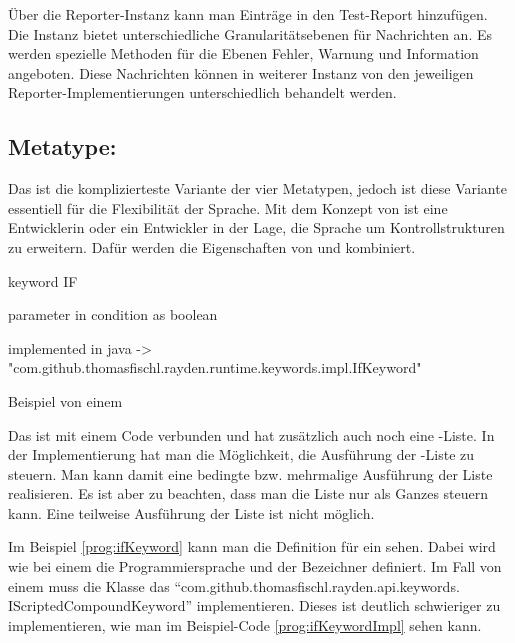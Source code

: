 \SuperPar
Über die Reporter-Instanz kann man Einträge in den Test-Report hinzufügen. Die Instanz bietet unterschiedliche Granularitätsebenen für Nachrichten an. Es werden spezielle Methoden für die Ebenen Fehler, Warnung und Information angeboten. Diese Nachrichten können in weiterer Instanz von den jeweiligen Reporter-Implementierungen unterschiedlich behandelt werden. 


\subsection{Metatype: }

Das  ist die komplizierteste Variante der vier Metatypen, jedoch ist diese Variante essentiell für die Flexibilität der Sprache. Mit dem Konzept von  ist eine Entwicklerin oder ein Entwickler in der Lage, die Sprache um Kontrollstrukturen zu erweitern. Dafür werden die Eigenschaften von  und  kombiniert. 

\begin{program}
\begin{JavaCode}
keyword IF { 
	parameter in condition as boolean

	implemented in java -> "com.github.thomasfischl.rayden.runtime.keywords.impl.IfKeyword"
}
\end{JavaCode}
\caption{Beispiel von einem }
\label{prog:ifKeyword}
\end{program}

\SuperPar
Das  ist mit einem Code verbunden und hat zusätzlich auch noch eine -Liste. In der Implementierung hat man die Möglichkeit, die Ausführung der -Liste zu steuern. Man kann damit eine bedingte bzw. mehrmalige Ausführung der Liste realisieren. Es ist aber zu beachten, dass man die Liste nur als Ganzes steuern kann. Eine teilweise Ausführung der Liste ist nicht möglich.

\SuperPar
Im Beispiel \ref{prog:ifKeyword} kann man die Definition für ein  sehen. Dabei wird wie bei einem  die Programmiersprache und der Bezeichner definiert. Im Fall von einem  muss die Klasse das  "`com.github.thomasfischl.rayden.api.keywords. IScriptedCompoundKeyword"' implementieren. Dieses  ist deutlich schwieriger zu implementieren, wie man im Beispiel-Code \ref{prog:ifKeywordImpl} sehen kann.

